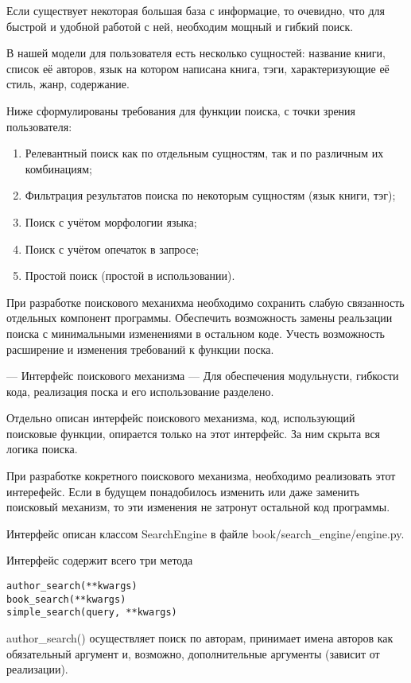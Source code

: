 
Если существует некоторая большая база с информацие, то очевидно, 
что для быстрой и удобной работой с ней, необходим мощный и гибкий поиск.

В нашей модели для пользователя есть несколько сущностей: название книги, 
список её авторов, язык на котором написана книга, тэги, характеризующие её стиль, жанр, содержание.

Ниже сформулированы требования для функции поиска, с точки зрения пользователя:
\begin{enumerate}
  \item  Релевантный поиск как по отдельным сущностям, так и по различным их комбинациям;
  \item  Фильтрация результатов поиска по некоторым сущностям (язык книги, тэг);
  \item  Поиск с учётом морфологии языка;
  \item  Поиск с учётом опечаток в запросе;
  \item  Простой поиск (простой в использовании).
\end{enumerate}

При разработке поискового механихма необходимо сохранить слабую связанность отдельных компонент программы. Обеспечить возможность замены реальзации поиска с минимальными изменениями в остальном коде. Учесть возможность расширение и изменения требований к функции поска.



--- Интерфейс поискового механизма ---
Для обеспечения модульнусти, гибкости кода, реализация поска и его использование разделено.

Отдельно описан интерфейс поискового механизма, код, использующий поисковые функции, опирается только на этот интерфейс. За ним скрыта вся логика поиска.

При разработке кокретного поискового механизма, необходимо реализовать этот интерефейс. Если в будущем понадобилось изменить или даже заменить поисковый механизм, то эти изменения не затронут остальной код программы.

Интерфейс описан классом SearchEngine в файле book/search\_engine/engine.py. 

Интерфейс содержит всего три метода 
\begin{verbatim}
author_search(**kwargs)
book_search(**kwargs)
simple_search(query, **kwargs)
\end{verbatim}


author\_search() осуществляет поиск по авторам, принимает имена авторов как обязательный аргумент и, возможно, дополнительные аргументы (зависит от реализации).

